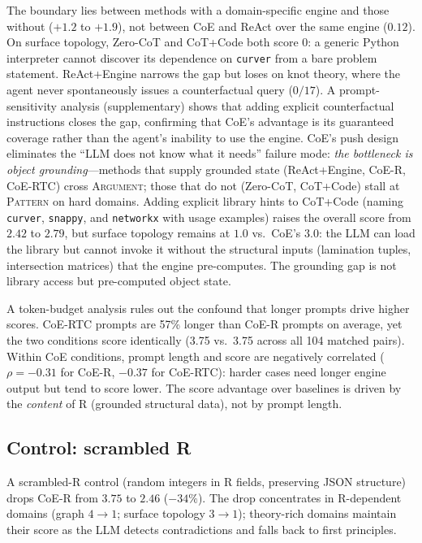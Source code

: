 \documentclass{article}
\begin{document}
The boundary lies between methods with a domain-specific engine and those
without ($+1.2$ to $+1.9$), not between CoE and ReAct over the same engine
($0.12$). On surface topology, Zero-CoT and CoT+Code both score $0$: a
generic Python interpreter cannot discover its dependence on \texttt{curver}
from a bare problem statement. ReAct+Engine narrows the gap but loses on
knot theory, where the agent never spontaneously issues a counterfactual
query ($0/17$). A prompt-sensitivity analysis (supplementary) shows that
adding explicit counterfactual instructions closes the gap, confirming
that CoE's advantage is its guaranteed coverage rather than the agent's
inability to use the engine.
CoE's push design eliminates the ``LLM does not know what it needs''
failure mode: \emph{the bottleneck is object grounding}---methods that
supply grounded state (ReAct+Engine, CoE-R, CoE-RTC) cross
\textsc{Argument}; those that do not (Zero-CoT, CoT+Code) stall at
\textsc{Pattern} on hard domains.
Adding explicit library hints to CoT+Code (naming \texttt{curver},
\texttt{snappy}, and \texttt{networkx} with usage examples) raises the
overall score from $2.42$ to $2.79$, but surface topology remains at $1.0$
vs.\ CoE's $3.0$: the LLM can load the library but cannot invoke it without
the structural inputs (lamination tuples, intersection matrices) that the
engine pre-computes. The grounding gap is not library access but
pre-computed object state.

A token-budget analysis rules out the confound that longer prompts drive
higher scores. CoE-RTC prompts are 57\% longer than CoE-R prompts on
average, yet the two conditions score identically (3.75 vs.\ 3.75 across
all 104 matched pairs). Within CoE conditions, prompt length and score are
negatively correlated ($\rho = -0.31$ for CoE-R, $-0.37$ for CoE-RTC):
harder cases need longer engine output but tend to score lower. The score
advantage over baselines is driven by the \emph{content} of R (grounded
structural data), not by prompt length.

\subsection{Control: scrambled R}
\label{sec:scrambled}
A scrambled-R control (random integers in R fields, preserving JSON
structure) drops CoE-R from $3.75$ to $2.46$ ($-34\%$). The drop
concentrates in R-dependent domains (graph $4 \to 1$; surface topology
$3 \to 1$); theory-rich domains maintain their score as the LLM detects
contradictions and falls back to first principles.
\end{document}
